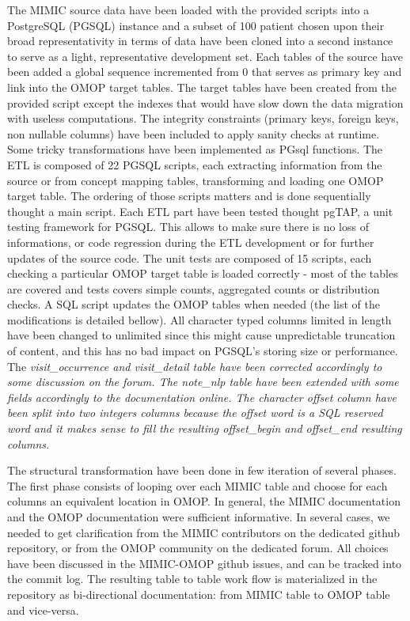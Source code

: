 
The MIMIC source data have been loaded with the provided scripts into a
PostgreSQL (PGSQL) instance and a subset of 100 patient chosen upon their
broad representativity in terms of data have been cloned into a second instance
to serve as a light, representative development set.  Each tables of the source
have been added a global sequence incremented from 0 that serves as primary key
and link into the OMOP target tables. The target tables have been created from
the provided script except the indexes that would have slow down the data
migration with useless computations. The integrity constraints (primary keys,
foreign keys, non nullable columns) have been included to apply sanity checks
at runtime. Some tricky transformations have been implemented as PGsql
functions.
The ETL is composed of 22 PGSQL scripts, each extracting information from the
source or from concept mapping tables, transforming and loading one OMOP target
table. The ordering of those scripts matters and is done sequentially thought a
main script.
Each ETL part have been tested thought pgTAP, a unit testing framework for PGSQL.
This allows to make sure there is no loss of informations, or code regression
during the ETL development or for further updates of the source code.
The unit tests are composed of 15 scripts, each checking a particular OMOP
target table is loaded correctly - most of the tables are covered and tests
covers simple counts, aggregated counts or distribution checks.
A SQL script updates the OMOP tables when needed (the list of the modifications
is detailed bellow). 
All character typed columns limited in length have been changed to unlimited
since this might cause unpredictable truncation of content, and this has no bad
impact on PGSQL's storing size or performance.
The \it{visit\_occurrence} and \it{visit\_detail} table have been corrected
accordingly to some discussion on the forum.
The \it{note\_nlp} table have been extended with some fields accordingly to
the documentation online. The character \it{offset} column have been split into
two integers columns because the offset word is a SQL reserved word and it
makes sense to fill the resulting \it{offset\_begin} and \it{offset\_end}
resulting columns.

The structural transformation have been done in few iteration of several phases.
The first phase consists of looping over each MIMIC table and choose for each
columns an equivalent location in OMOP. In general, the MIMIC documentation and
the OMOP documentation were sufficient informative. In several cases, we needed
to get clarification from the MIMIC contributors on the dedicated github
repository, or from the OMOP community on the dedicated forum.
All choices have been discussed in the MIMIC-OMOP github issues, and can be
tracked into the commit log. The resulting table to table work flow is
materialized in the repository as bi-directional documentation: from MIMIC
table to OMOP table and vice-versa.


